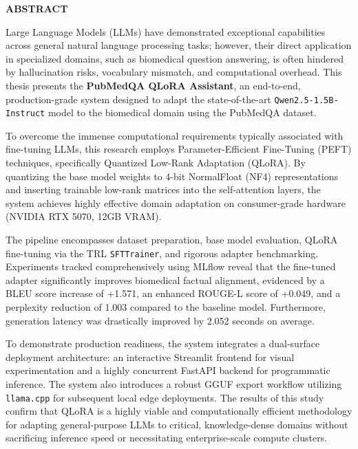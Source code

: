 \documentclass[12pt,a4paper]{report}
\begin{document}
\newpage
{}
\begin{center}
    \Large \textbf{ABSTRACT}
\end{center}
\vspace{1cm}
Large Language Models (LLMs) have demonstrated exceptional capabilities across general natural language processing tasks; however, their direct application in specialized domains, such as biomedical question answering, is often hindered by hallucination risks, vocabulary mismatch, and computational overhead. This thesis presents the \textbf{PubMedQA QLoRA Assistant}, an end-to-end, production-grade system designed to adapt the state-of-the-art \texttt{Qwen2.5-1.5B-Instruct} model to the biomedical domain using the PubMedQA dataset.

To overcome the immense computational requirements typically associated with fine-tuning LLMs, this research employs Parameter-Efficient Fine-Tuning (PEFT) techniques, specifically Quantized Low-Rank Adaptation (QLoRA). By quantizing the base model weights to 4-bit NormalFloat (NF4) representations and inserting trainable low-rank matrices into the self-attention layers, the system achieves highly effective domain adaptation on consumer-grade hardware (NVIDIA RTX 5070, 12GB VRAM).

The pipeline encompasses dataset preparation, base model evaluation, QLoRA fine-tuning via the TRL \texttt{SFTTrainer}, and rigorous adapter benchmarking. Experiments tracked comprehensively using MLflow reveal that the fine-tuned adapter significantly improves biomedical factual alignment, evidenced by a BLEU score increase of +1.571, an enhanced ROUGE-L score of +0.049, and a perplexity reduction of 1.003 compared to the baseline model. Furthermore, generation latency was drastically improved by 2.052 seconds on average.

To demonstrate production readiness, the system integrates a dual-surface deployment architecture: an interactive Streamlit frontend for visual experimentation and a highly concurrent FastAPI backend for programmatic inference. The system also introduces a robust GGUF export workflow utilizing \texttt{llama.cpp} for subsequent local edge deployments. The results of this study confirm that QLoRA is a highly viable and computationally efficient methodology for adapting general-purpose LLMs to critical, knowledge-dense domains without sacrificing inference speed or necessitating enterprise-scale compute clusters.
\end{document}
